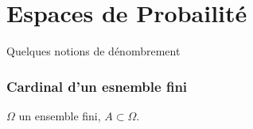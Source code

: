 \part{Espaces de Probailité}
  Quelques notions de dénombrement
  \section{Cardinal d'un esnemble fini}
  $\Omega$ un ensemble fini, $A\subset\Omega$.
